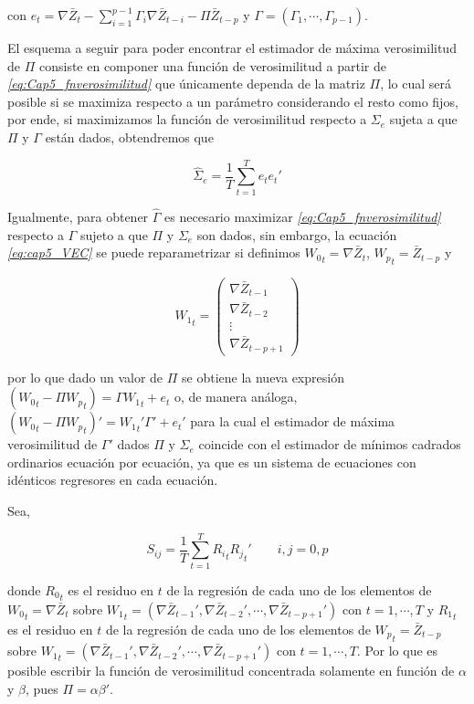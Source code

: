 con $e_t=\nabla \bar{Z}_t-\sum_{i=1}^{p-1}\Gamma_i\nabla\bar{Z}_{t-i} - \Pi\bar{Z}_{t-p}$ y $\Gamma=(\Gamma_1,\cdots, \Gamma_{p-1})$.\bigskip 

El esquema a seguir para poder encontrar el estimador de máxima verosimilitud de $\Pi$ consiste en componer una función de verosimilitud a partir de \textit{\ref{eq:Cap5_fnverosimilitud}} que únicamente dependa de la matriz $\Pi$, lo cual será posible si se maximiza respecto a un parámetro considerando el resto como fijos, por ende, si maximizamos la función de verosimilitud respecto a $\Sigma_e$ sujeta a que $\Pi$ y $\Gamma$ están dados, obtendremos que

\begin{equation}
\widehat{\Sigma}_e=\frac{1}{T}\sum_{t=1}^{T}e_te_t'
\end{equation} 
 
 Igualmente, para obtener $\widehat{\Gamma}$ es necesario maximizar \textit{\ref{eq:Cap5_fnverosimilitud}} respecto a $\Gamma$ sujeto a que $\Pi$ y $\Sigma_e$ son dados, sin embargo, la ecuación  \textit{\ref{eq:cap5_VEC}} se puede reparametrizar si definimos ${W_0}_t= \nabla \bar{Z}_t$, ${W_p}_t=\bar{Z}_{t-p}$ y 
 
 \begin{equation}
 {W_1}_t=\begin{pmatrix}
\nabla \bar{Z}_{t-1}\\ 
\nabla \bar{Z}_{t-2}\\ 
\vdots\\ 
\nabla \bar{Z}_{t-p+1}
\end{pmatrix}
 \end{equation}
 
 por lo que dado un valor de $\Pi$ se obtiene la nueva expresión $( {W_0}_t - \Pi {W_p}_t)=\Gamma {W_1}_t + e_t$ o, de manera análoga, $ ({W_0}_t - \Pi {W_p}_t)'= {W_1}_t'\Gamma' + e_t'$ para la cual el estimador de máxima verosimilitud de $\Gamma'$ dados $\Pi$ y $\Sigma_e$ coincide con el estimador de mínimos cadrados ordinarios ecuación por ecuación, ya que es un sistema de ecuaciones con idénticos regresores en cada ecuación. \bigskip 
 
 Sea,
 
 \begin{equation}
 S_{ij}=\frac{1}{T} \sum_{t=1}^{T}{R_i}_t{R_j}_t' \qquad  i,j=0,p
 \end{equation}
 
 donde ${R_0}_t$ es el residuo en $t$ de la regresión de cada uno de los elementos de $ {W_0}_t =\nabla \bar{Z}_{t}$ sobre ${W_1}_t =(\nabla \bar{Z}_{t-1}', \nabla \bar{Z}_{t-2}',\cdots, \nabla \bar{Z}_{t-p+1}' )$ con $t=1, \cdots, T$ y ${R_1}_t$ es el residuo en $t$ de la regresión de cada uno de los elementos de ${W_p}_t=\bar{Z}_{t-p}$ sobre $ {W_1}_t =(\nabla \bar{Z}_{t-1}', \nabla \bar{Z}_{t-2}',\cdots, \nabla \bar{Z}_{t-p+1}' )$ con $t=1, \cdots, T$. Por lo que es posible escribir la función de verosimilitud concentrada solamente en función de $\alpha$ y $\beta$, pues $\Pi=\alpha\beta'$.
 
